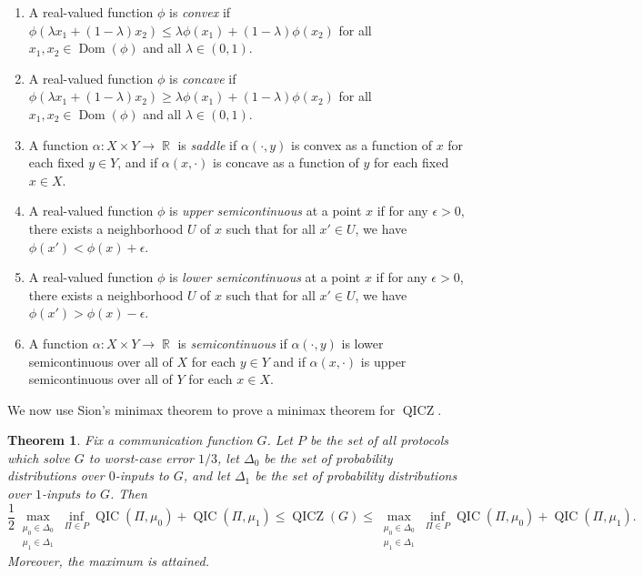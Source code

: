 \documentclass[10pt,a4paper]{article}
\newtheorem{theorem}{Theorem}
\theoremstyle{definition}
\DeclareMathOperator{\Dom}{Dom}
\renewcommand{\>}{\rangle}
\newcommand{\<}{\langle}
\DeclareMathOperator{\bR}{\mathbb{R}}
\DeclareMathOperator{\QICZ}{QICZ}
\DeclareMathOperator{\QIC}{QIC}
\begin{document}
\begin{enumerate}
\item A real-valued function $\phi$ is \emph{convex}
if $\phi(\lambda x_1+(1-\lambda)x_2)\le
\lambda \phi(x_1)+(1-\lambda)\phi(x_2)$
for all $x_1,x_2\in\Dom(\phi)$ and all $\lambda\in(0,1)$.
\item A real-valued function $\phi$ is \emph{concave}
if $\phi(\lambda x_1+(1-\lambda)x_2)\ge
\lambda \phi(x_1)+(1-\lambda)\phi(x_2)$
for all $x_1,x_2\in\Dom(\phi)$ and all $\lambda\in(0,1)$.
\item A function $\alpha\colon X\times Y\to\bR$ is \emph{saddle}
if $\alpha(\cdot, y)$ is convex as a function of
$x$ for each fixed $y\in Y$, and if $\alpha(x,\cdot)$
is concave as a function of $y$ for each fixed $x\in X$.
\item A real-valued function $\phi$ is \emph{upper semicontinuous}
at a point $x$ if for any $\epsilon>0$, there exists
a neighborhood $U$ of $x$ such that for all $x'\in U$,
we have $\phi(x')<\phi(x)+\epsilon$.
\item A real-valued function $\phi$ is \emph{lower semicontinuous}
at a point $x$ if for any $\epsilon>0$, there exists
a neighborhood $U$ of $x$ such that for all $x'\in U$,
we have $\phi(x')>\phi(x)-\epsilon$.
\item A function $\alpha\colon X\times Y\to\bR$
is \emph{semicontinuous} if $\alpha(\cdot,y)$ is lower semicontinuous
over all of $X$ for each $y\in Y$ and if $\alpha(x,\cdot)$
is upper semicontinuous over all of $Y$ for each $x\in X$.
\end{enumerate}

We now use Sion's minimax theorem to prove a minimax theorem
for $\QICZ$.

\begin{theorem}\label{thm:QICZ_minimax}
Fix a communication function $G$. Let $P$
be the set of all protocols which solve $G$ to worst-case
error $1/3$, let $\Delta_0$ be the set of probability
distributions over $0$-inputs to $G$, and let
$\Delta_1$ be the set of probability distributions
over $1$-inputs to $G$. Then
\[\frac12 
\max_{\substack{\mu_0\in\Delta_0\\\mu_1\in\Delta_1}}
\inf_{\Pi\in P}\QIC(\Pi,\mu_0)+\QIC(\Pi,\mu_1)
\le \QICZ(G)\le 
\max_{\substack{\mu_0\in\Delta_0\\\mu_1\in\Delta_1}}
\inf_{\Pi\in P}\QIC(\Pi,\mu_0)+\QIC(\Pi,\mu_1).\]
Moreover, the maximum is attained.
\end{theorem}
\end{document}
